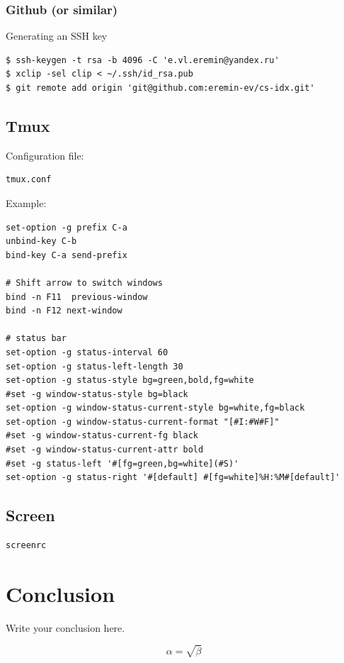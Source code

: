 \documentclass[12pt,a4paper]{article}
\begin{document}
\subsubsection{Github (or similar)}

Generating an SSH key

\begin{verbatim}
$ ssh-keygen -t rsa -b 4096 -C 'e.vl.eremin@yandex.ru'
$ xclip -sel clip < ~/.ssh/id_rsa.pub
$ git remote add origin 'git@github.com:eremin-ev/cs-idx.git'
\end{verbatim}

\subsection{Tmux}

Configuration file:

\begin{verbatim}
tmux.conf
\end{verbatim}

Example:

\begin{verbatim}
set-option -g prefix C-a
unbind-key C-b
bind-key C-a send-prefix

# Shift arrow to switch windows
bind -n F11  previous-window
bind -n F12 next-window

# status bar
set-option -g status-interval 60
set-option -g status-left-length 30
set-option -g status-style bg=green,bold,fg=white
#set -g window-status-style bg=black
set-option -g window-status-current-style bg=white,fg=black
set-option -g window-status-current-format "[#I:#W#F]"
#set -g window-status-current-fg black
#set -g window-status-current-attr bold
#set -g status-left '#[fg=green,bg=white](#S)'
set-option -g status-right '#[default] #[fg=white]%H:%M#[default]'
\end{verbatim}

\subsection{Screen}

\begin{verbatim}
screenrc
\end{verbatim}

\section{Conclusion}

Write your conclusion here.

\begin{equation}
    \label{simple_equation}
    \alpha = \sqrt{\beta}
\end{equation}
\end{document}
